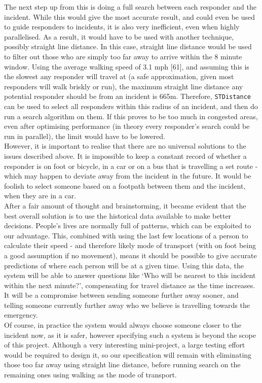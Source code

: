 \documentclass{article}
\begin{document}
The next step up from this is doing a full search between each responder and the incident. While this would give the most accurate result, and could even be used to guide responders to incidents, it is also very inefficient, even when highly parallelised. As a result, it would have to be used with another technique, possibly straight line distance. In this case, straight line distance would be used to filter out those who are simply too far away to arrive within the 8 minute window. Using the average walking speed of 3.1 mph [61], and assuming this is the slowest any responder will travel at (a safe approximation, given most responders will walk briskly or run), the maximum straight line distance any potential responder should be from an incident is 665m. Therefore, \texttt{\color{OliveGreen}STDistance} can be used to select all responders within this radius of an incident, and then do run a search algorithm on them. If this proves to be too much in congested areas, even after optimising performance (in theory every responder’s search could be run in parallel), the limit would have to be lowered.\\

However, it is important to realise that there are no universal solutions to the issues described above. It is impossible to keep a constant record of whether a responder is on foot or bicycle, in a car or on a bus that is travelling a set route - which may happen to deviate away from the incident in the future. It would be foolish to select someone based on a footpath between them and the incident, when they are in a car.\\

After a fair amount of thought and brainstorming, it became evident that the best overall solution is to use the historical data available to make better decisions. People’s lives are normally full of patterns, which can be exploited to our advantage. This, combined with using the last few locations of a person to calculate their speed - and therefore likely mode of transport (with on foot being a good assumption if no movement), means it should be possible to give accurate predictions of where each person will be at a given time. Using this data, the system will be able to answer questions like ‘Who will be nearest to this incident within the next minute?’, compensating for travel distance as the time increases. It will be a compromise between sending someone further away sooner, and telling someone currently further away who we believe is travelling towards the emergency.\\

Of course, in practice the system would always choose someone closer to the incident now, as it is safer, however specifying such a system is beyond the scope of this project. Although a very interesting mini-project, a large testing effort would be required to design it, so our specification will remain with eliminating those too far away using straight line distance, before running search on the remaining ones using walking as the mode of transport.
\end{document}
